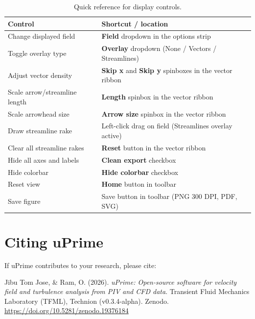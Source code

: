 \documentclass[11pt, a4paper]{report}
\newcommand{\uipth}[1]{\textbf{\textcolor{upblue}{#1}}}
\begin{document}
\begin{table}[htbp]
\centering
\caption{Quick reference for display controls.}
\begin{tabular}{ll}
\toprule
\textbf{Control} & \textbf{Shortcut / location} \\
\midrule
Change displayed field     & \uipth{Field} dropdown in the options strip \\
Toggle overlay type        & \uipth{Overlay} dropdown (None / Vectors / Streamlines) \\
Adjust vector density      & \uipth{Skip x} and \uipth{Skip y} spinboxes in the vector ribbon \\
Scale arrow/streamline length & \uipth{Length} spinbox in the vector ribbon \\
Scale arrowhead size       & \uipth{Arrow size} spinbox in the vector ribbon \\
Draw streamline rake       & Left-click drag on field (Streamlines overlay active) \\
Clear all streamline rakes & \uipth{Reset} button in the vector ribbon \\
Hide all axes and labels   & \uipth{Clean export} checkbox \\
Hide colorbar              & \uipth{Hide colorbar} checkbox \\
Reset view                 & \uipth{Home} button in toolbar \\
Save figure                & Save button in toolbar (PNG 300 DPI, PDF, SVG) \\
\bottomrule
\end{tabular}
\end{table}

\appendix

\chapter{Citing uPrime}

If uPrime contributes to your research, please cite:

\begin{mdframed}[backgroundcolor=uplightgray, linecolor=upboxborder, linewidth=1pt]
Jibu Tom Jose, \& Ram, O. (2026). \textit{uPrime: Open-source software for velocity field and turbulence analysis from PIV and CFD data}. Transient Fluid Mechanics Laboratory (TFML), Technion (v0.3.4-alpha). Zenodo.\\
\url{https://doi.org/10.5281/zenodo.19376184}
\end{mdframed}
\end{document}

